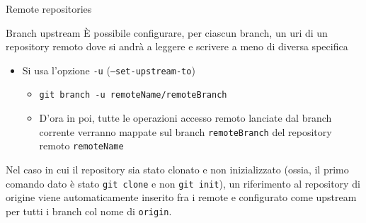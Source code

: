 \documentclass[xcolor=dvipsnames,presentation]{beamer}
\begin{document}
\begin{frame}{Remote repositories}
	\begin{block}{Branch upstream}
		È possibile configurare, per ciascun branch, un uri di un repository remoto dove si andrà a leggere e scrivere a meno di diversa specifica
		\begin{itemize}
			\item Si usa l'opzione \texttt{-u} (\texttt{--set-upstream-to})
			\begin{itemize}
				\item \texttt{git branch -u remoteName/remoteBranch}
				\item D'ora in poi, tutte le operazioni accesso remoto lanciate dal branch corrente verranno mappate sul branch \texttt{remoteBranch} del repository remoto \texttt{remoteName}
			\end{itemize}
		\end{itemize}
		Nel caso in cui il repository sia stato clonato e non inizializzato (ossia, il primo comando dato è stato \texttt{git clone} e non \texttt{git init}), un riferimento al repository di origine viene automaticamente inserito fra i remote e configurato come upstream per tutti i branch col nome di \texttt{origin}.

\end{block}
\end{frame}
\end{document}
